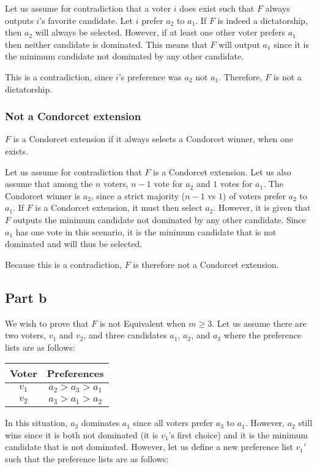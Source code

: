 \documentclass[12pt]{article}%
\begin{document}
Let us assume for contradiction that a voter $i$ does exist such that $F$ always outputs $i$'s favorite candidate. Let $i$ prefer $a_2$ to $a_1$. If $F$ is indeed a dictatorship, then $a_2$ will always be selected. However, if at least one other voter prefers $a_1$ then neither candidate is dominated. This means that $F$ will output $a_1$ since it is the minimum candidate not dominated by any other candidate.

This is a contradiction, since $i$'s preference was $a_2$ not $a_1$. Therefore, $F$ is not a dictatorship.

\subsubsection*{Not a Condorcet extension}
$F$ is a Condorcet extension if it always selects a Condorcet winner, when one exists.

Let us assume for contradiction that $F$ is a Condorcet extension. Let us also assume that among the $n$ voters, $n - 1$ vote for $a_2$ and $1$ votes for $a_1$. The Condorcet winner is $a_2$, since a strict majority ($n -1$ vs $1$) of voters prefer $a_2$ to $a_1$. If $F$ is a Condorcet extension, it must then select $a_2$. However, it is given that $F$ outputs the minimum candidate not dominated by any other candidate. Since $a_1$ has one vote in this scenario, it is the minimum candidate that is not dominated and will thus be selected. 

Because this is a contradiction, $F$ is therefore not a Condorcet extension.

\subsection*{Part b}
We wish to prove that $F$ is not Equivalent when $m \ge 3$. Let us assume there are two voters, $v_1$ and $v_2$, and three candidates $a_1$, $a_2$, and $a_3$ where the preference lists are as follows:

\begin{center}
\begin{tabular}{|c|c|}
\hline
Voter & Preferences       \\ \hline
$v_1$ & $a_2 > a_3 > a_1$ \\ \hline
$v_2$ & $a_3 > a_1 > a_2$ \\ \hline
\end{tabular}
\end{center}

In this situation, $a_3$ dominates $a_1$ since all voters prefer $a_3$ to $a_1$. However, $a_2$ still wins since it is both not dominated (it is $v_1$'s first choice) and it is the minimum candidate that is not dominated. However, let us define a new preference list $v_1'$ such that the preference lists are as follows:
\end{document}
